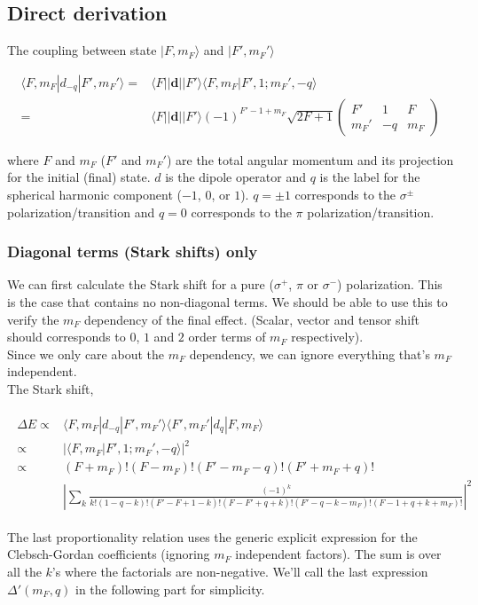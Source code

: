 \documentclass[10pt,fleqn]{article}
\newcommand{\eqar}[1]
{
  \begin{align}
    #1
  \end{align}
}
\newcommand{\abs}[1]{{\left|{#1}\right|}}
\begin{document}
\subsection{Direct derivation}
The coupling between state $|F,m_F\rangle$ and $|F',m_F'\rangle$
\eqar{
  \langle F,m_F|d_{-q}|F',m_F'\rangle=&\langle F||\mathbf{d}||F'\rangle\langle F,m_F|F',1;m_F',-q\rangle\\
  =&\langle F||\mathbf{d}||F'\rangle (-1)^{F'-1+m_F}\sqrt{2F+1}
  \begin{pmatrix}
    F'&1&F\\
    m_F'&-q&m_F
  \end{pmatrix}
}
where $F$ and $m_F$ ($F'$ and $m_F'$) are the total angular momentum and its projection
for the initial (final) state. $d$ is the dipole operator and $q$ is the label
for the spherical harmonic component ($-1$, $0$, or $1$).
$q=\pm1$ corresponds to the $\sigma^\pm$ polarization/transition
and $q=0$ corresponds to the $\pi$ polarization/transition.\\

\subsubsection{Diagonal terms (Stark shifts) only}\label{stark-shift-explicit}
We can first calculate the Stark shift for a pure
($\sigma^+$, $\pi$ or $\sigma^-$) polarization.
This is the case that contains no non-diagonal terms.
We should be able to use this to verify the $m_F$ dependency of the final effect.
(Scalar, vector and tensor shift should corresponds to $0$, $1$ and $2$ order terms
of $m_F$ respectively).\\

Since we only care about the $m_F$ dependency, we can ignore everything that's
$m_F$ independent.\\

The Stark shift,
\eqar{
  \begin{split}
    \Delta E\propto&\langle F,m_F|d_{-q}|F',m_F'\rangle
                     \langle F',m_F'|d_q|F,m_F\rangle\\
    \propto&\abs{\langle F,m_F|F',1;m_F',-q\rangle}^2\\
    \propto&(F+m_F)!(F-m_F)!(F'-m_F-q)!(F'+m_F+q)!\\
                   &\abs{\sum_{k}\frac{(-1)^k}{k!(1\!-\!q\!-\!k)!(F'\!-\!F\!+\!1\!-\!k)!(F\!-\!F'\!+\!q\!+\!k)!(F'\!-\!q\!-\!k\!-\!m_F)!(F\!-\!1\!+\!q\!+\!k\!+\!m_F)!}}^2
  \end{split}
}
The last proportionality relation uses the generic explicit expression for the
Clebsch-Gordan coefficients (ignoring $m_F$ independent factors).
The sum is over all the $k$'s where the factorials are non-negative.
We'll call the last expression $\Delta'(m_F,q)$ in the following part for simplicity.
\end{document}
